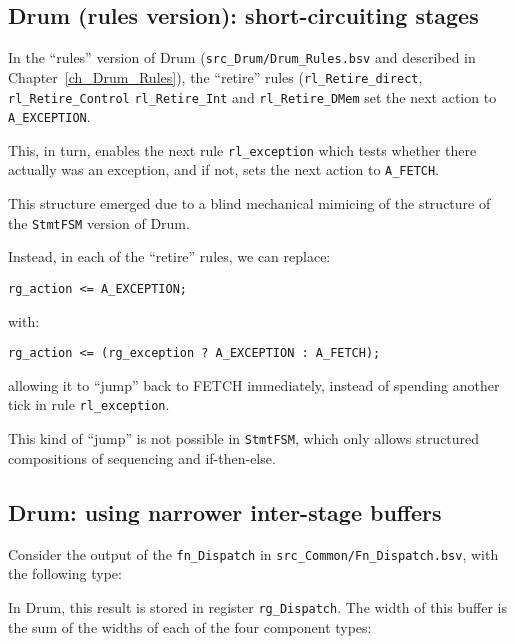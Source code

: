 \subsection{Drum (rules version): short-circuiting stages}

In the ``rules'' version of Drum (\verb|src_Drum/Drum_Rules.bsv| and
described in Chapter~\ref{ch_Drum_Rules}), the ``retire'' rules
(\verb|rl_Retire_direct|, \verb|rl_Retire_Control|
\verb|rl_Retire_Int| and \verb|rl_Retire_DMem| set the next action to
\verb|A_EXCEPTION|.

This, in turn, enables the next rule \verb|rl_exception| which tests
whether there actually was an exception, and if not, sets the next
action to \verb|A_FETCH|.

This structure emerged due to a blind mechanical mimicing of the
structure of the \verb|StmtFSM| version of Drum.

Instead, in each of the ``retire'' rules, we can replace:

{\footnotesize
\begin{Verbatim}[frame=single]
      rg_action <= A_EXCEPTION;
\end{Verbatim}
}

with:

{\footnotesize
\begin{Verbatim}[frame=single]
      rg_action <= (rg_exception ? A_EXCEPTION : A_FETCH);
\end{Verbatim}
}

allowing it to ``jump'' back to FETCH immediately, instead of spending
another tick in rule \verb|rl_exception|.

This kind of ``jump'' is not possible in \verb|StmtFSM|, which only
allows structured compositions of sequencing and if-then-else.


\subsection{Drum: using narrower inter-stage buffers}

Consider the output of the \verb|fn_Dispatch| in
\verb|src_Common/Fn_Dispatch.bsv|, with the following type:


In Drum, this result is stored in register \verb|rg_Dispatch|.  The
width of this buffer is the sum of the widths of each of the four
component types:

